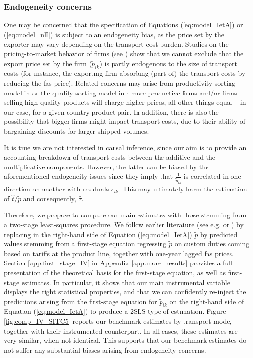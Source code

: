\documentclass[a4paper,11pt]{article}
\begin{document}
\subsubsection{Endogeneity concerns} One may be concerned that the specification of Equations (\ref{eq:model_IetA}) or (\ref{eq:model_nlI}) is subject to an endogeneity bias, as the price set by the exporter may vary depending on the transport cost burden. Studies on the pricing-to-market behavior of firms (see \citealp{Krugman-87}) show that we cannot exclude that the export price set by the firm ($\widetilde{p}_{ik}$) is partly endogenous to the size of transport costs (for instance, the exporting firm absorbing (part of) the transport costs by reducing the fas price).
Related concerns may arise from productivity-sorting model in \cite{melitz} or the quality-sorting model in \cite{baldwin_harrigan}: more productive firms and/or firms selling high-quality products will charge higher prices, all other things equal – in our case, for a given country-product pair. In addition, there is also the possibility that bigger firms might impact transport costs, due to their ability of bargaining discounts for larger shipped volumes.

It is true we are not interested in causal inference, since our aim is to provide an accounting breakdown of transport costs between the additive and the multiplicative components. However, the latter can be biased by the aforementioned endogeneity issues since they imply that $\frac{1}{\widetilde{p}_{ik}}$ is correlated in one direction on another with residuals $\epsilon_{ik}$. This may ultimately harm the estimation of $\widehat{t}/\widetilde{p}$ and consequently, $\widehat{\tau}$.

Therefore, we propose to compare our main estimates with those stemming from a two-stage least-squares procedure. We follow earlier literature (see e.g. \citealp{Caliendo_Parro_2015} or \citealp{Lashkaripour-2017}) by replacing in the right-hand side of Equation (\ref{eq:model_IetA}) $\widetilde{p}$ by predicted values stemming from a first-stage equation regressing $\widetilde{p}$ on custom duties coming based on tariffs at the product line, together with one-year lagged fas prices. Section \ref{app:first_stage_IV} in Appendix \ref{app:more_results} provides a full presentation of the theoretical basis for the first-stage equation, as well as first-stage estimates. In particular, it shows that our main instrumental variable displays the right statistical properties, and that we can confidently re-inject the predictions arising from the first-stage equation for $\widetilde{p}_{ik}$ on the right-hand side of Equation (\ref{eq:model_IetA}) %
 to produce a 2SLS-type of estimation. Figure \ref{fig:comp_IV_SITC5} reports our benchmark estimates by transport mode, together with their instrumented counterpart. In all cases, these estimates are very similar, when not identical. This supports that our benchmark estimates do not suffer any substantial biases arising from endogeneity concerns.
\end{document}
